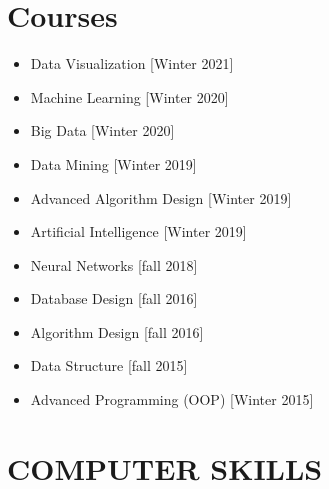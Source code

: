 \documentclass[10pt,a4paper,sans]{moderncv} %
\begin{document}
	\section{Courses}
	\begin{multicols}{2}
		\begin{itemize}
			\item {} Data Visualization \hfill[Winter 2021]
			\item {} Machine Learning \hfill[Winter 2020]
			\item {} Big Data \hfill[Winter 2020]
			\item {} Data Mining \hfill[Winter 2019]
			\item {} Advanced Algorithm Design \hfill[Winter 2019]
			\item {} Artificial Intelligence \hfill[Winter 2019]
			\item {} Neural Networks \hfill[fall 2018]
			\item {} Database Design \hfill[fall 2016]
			\item {} Algorithm Design \hfill[fall 2016]	
			\item {} Data Structure \hfill[fall 2015]
			\item {} Advanced Programming (OOP) \hfill[Winter 2015]
		\end{itemize}
	\end{multicols}
	
	
		
	\section{COMPUTER SKILLS}
	
\end{document}

